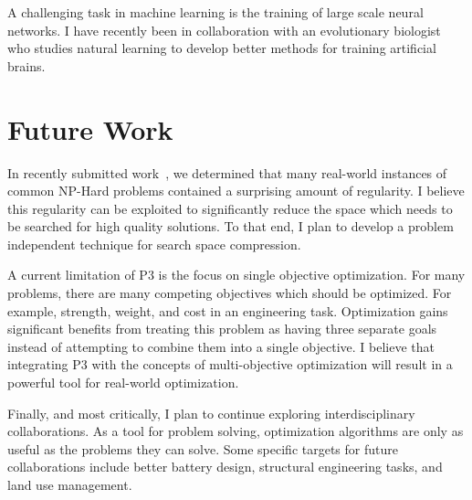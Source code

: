 \documentclass[a4paper, 11pt]{article}
\begin{document}
A challenging task in machine learning is the training of large scale neural networks.
I have recently been in collaboration with an evolutionary biologist
who studies natural learning to develop better methods for training artificial brains.

\section{Future Work}
In recently submitted work~\cite{whitley:2016:mkl}, we determined that many real-world
instances of common NP-Hard problems contained a surprising amount of regularity.
I believe this regularity can be exploited to significantly reduce the space
which needs to be searched for high quality solutions. To that end, I plan to develop
a problem independent technique for search space compression.

A current limitation of P3 is the focus on single objective optimization. For many
problems, there are many competing objectives which should be optimized. For example,
strength, weight, and cost in an engineering task. Optimization gains significant
benefits from treating this problem as having three separate goals instead of attempting
to combine them into a single objective. I believe that integrating P3 with the concepts
of multi-objective optimization will result in a powerful tool for real-world optimization.

Finally, and most critically, I plan to continue exploring interdisciplinary collaborations.
As a tool for problem solving, optimization algorithms are only as useful as the problems they
can solve. Some specific targets for future collaborations include better battery design,
structural engineering tasks, and land use management.




\small



\end{document}
